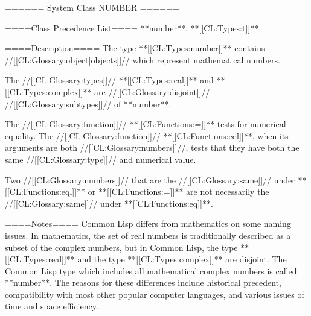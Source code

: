 ====== System Class NUMBER ======

====Class Precedence List==== 
**number**, **[[CL:Types:t]]**

====Description====
The type **[[CL:Types:number]]** contains //[[CL:Glossary:object|objects]]// which represent mathematical numbers.

The //[[CL:Glossary:types]]// **[[CL:Types:real]]** and **[[CL:Types:complex]]** are //[[CL:Glossary:disjoint]]// //[[CL:Glossary:subtypes]]// of **number**.

The //[[CL:Glossary:function]]// **[[CL:Functions:=]]** tests for numerical equality. The //[[CL:Glossary:function]]// **[[CL:Functions:eql]]**, when its arguments are both //[[CL:Glossary:numbers]]//, tests that they have both the same //[[CL:Glossary:type]]// and numerical value.

Two //[[CL:Glossary:numbers]]// that are the //[[CL:Glossary:same]]// under **[[CL:Functions:eql]]** or **[[CL:Functions:=]]** are not necessarily the //[[CL:Glossary:same]]// under **[[CL:Functions:eq]]**.

====Notes====
Common Lisp differs from mathematics on some naming issues. In mathematics, the set of real numbers is traditionally described as a subset of the complex numbers, but in Common Lisp, the type **[[CL:Types:real]]** and the type **[[CL:Types:complex]]** are disjoint. The Common Lisp type which includes all mathematical complex numbers is called **number**. The reasons for these differences include historical precedent, compatibility with most other popular computer languages, and various issues of time and space efficiency.

